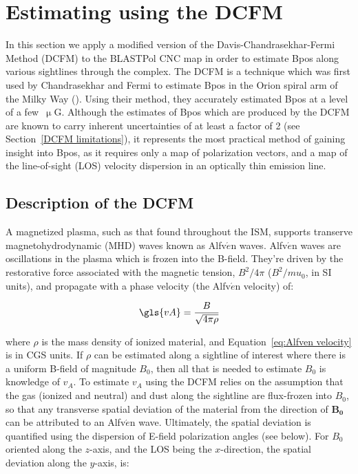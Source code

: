 \section{Estimating  using the DCFM}\label{DCFM}

In this section we apply a modified version of the Davis-Chandrasekhar-Fermi Method (DCFM) to the BLASTPol CNC map in order to estimate \gls{Bpos} along various sightlines through the complex. The DCFM is a technique which was first used by Chandrasekhar and Fermi to estimate \gls{Bpos} in the Orion spiral arm of the Milky Way (\citet{davis1951strength,chandrasekhar1953magnetic}). Using their method, they accurately estimated \gls{Bpos} at a level of a few~$\upmu$G. Although the estimates of \gls{Bpos} which are produced by the DCFM are known to carry inherent uncertainties of at least a factor of 2 (see Section~\ref{DCFM limitations}), it represents the most practical method of gaining insight into \gls{Bpos}, as it requires only a map of polarization vectors, and a map of the line-of-sight (LOS) velocity dispersion in an optically thin emission line.

\subsection{Description of the DCFM}

A magnetized plasma, such as that found throughout the ISM, supports transerve magnetohydrodynamic (MHD) waves known as Alfv$\acute{e}$n waves. Alfv$\acute{e}$n waves are  oscillations in the plasma which is frozen into the B-field. They're driven by the restorative force associated with the magnetic tension, $B^{2}/4\pi$ ($B^{2}/mu_{0}$, in SI units), and propagate with a phase velocity (the Alfv$\acute{e}$n velocity) of:

\begin{equation}\label{eq:Alfven velocity}
  \gls{vA} = \frac{B}{\sqrt{4 \pi \rho}}
\end{equation}

where $\rho$ is the mass density of ionized material, and Equation~\ref{eq:Alfven velocity} is in CGS units. If $\rho$ can be estimated along a sightline of interest where there is a uniform B-field of magnitude $B_{0}$, then all that is needed to estimate $B_{0}$ is knowledge of $v_{A}$. To estimate $v_{A}$ using the DCFM relies on the assumption that the gas (ionized and neutral) and dust along the sightline are flux-frozen into $B_{0}$, so that any transverse spatial deviation of the material from the direction of $\boldsymbol{B_{0}}$ can be attributed to an Alfv$\acute{e}$n wave. Ultimately, the spatial deviation is quantified using the dispersion of E-field polarization angles (see below). For $B_{0}$ oriented along the $z$-axis, and the LOS being the $x$-direction, the spatial deviation along the $y$-axis, is:

